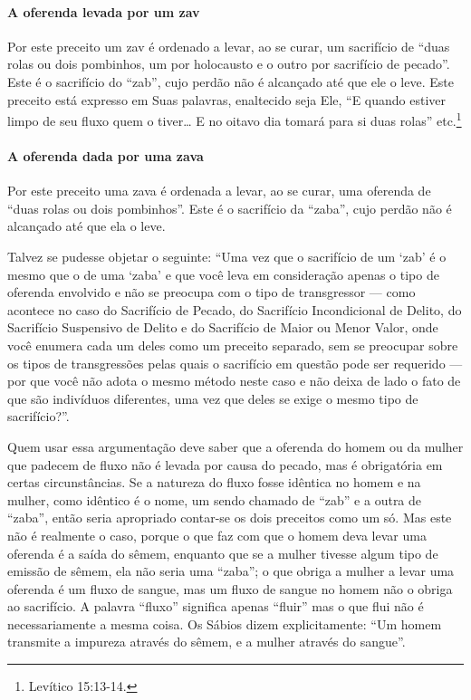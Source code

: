 \paragraph{A oferenda levada por um zav\starr}

Por este preceito um zav\starr{} é ordenado a levar, ao
se curar, um sacrifício de ``duas rolas ou dois pombinhos, um por holocausto e o
outro por sacrifício de pecado''. Este é o sacrifício do ``zab'', cujo perdão não
é alcançado até que ele o leve. Este preceito está expresso em Suas
palavras, enaltecido seja Ele, ``E quando estiver limpo de seu fluxo
quem o tiver\ldots{} E no oitavo dia tomará para si duas rolas'' etc.\footnote{Levítico 15:13-14.}

\paragraph{A oferenda dada por uma zava\starr}

Por este preceito uma zava\starr{} é ordenada a levar,
ao se curar, uma oferenda de ``duas rolas ou dois pombinhos''. Este é o
sacrifício da ``zaba'', cujo perdão não é alcançado até que ela o leve.

Talvez se pudesse objetar o seguinte: ``Uma vez que o sacrifício de um
`zab' é o mesmo que o de uma `zaba' e que você leva em consideração
apenas o tipo de oferenda envolvido e não se preocupa com o tipo de
transgressor --- como acontece no caso do Sacrifício de Pecado, do
Sacrifício Incondicional de Delito, do Sacrifício Suspensivo de Delito
e do Sacrifício de Maior ou Menor Valor, onde você enumera cada um deles
como um preceito separado, sem se preocupar sobre os tipos de
transgressões pelas quais o sacrifício em questão pode ser requerido ---
por que você não adota o mesmo método neste caso e não deixa de lado o
fato de que são indivíduos diferentes, uma vez que deles se exige o
mesmo tipo de sacrifício?''.

Quem usar essa argumentação deve saber que a oferenda do homem ou da
mulher que padecem de fluxo não é levada por causa do pecado, mas é
obrigatória em certas circunstâncias. Se a natureza do fluxo fosse
idêntica no homem e na mulher, como idêntico é o nome, um sendo chamado
de ``zab'' e a outra de ``zaba'', então seria apropriado contar-se os
dois preceitos como um só. Mas este não é realmente o caso, porque o que
faz com que o homem deva levar uma oferenda é a saída do sêmem, enquanto
que se a mulher tivesse algum tipo de emissão de sêmem, ela não seria
uma ``zaba''; o que obriga a mulher a levar uma oferenda é um fluxo de sangue, mas um fluxo de sangue
no homem não o obriga ao sacrifício. A palavra ``fluxo'' significa
apenas ``fluir'' mas o que flui não é necessariamente a mesma coisa. Os
Sábios dizem explicitamente: ``Um homem transmite a impureza através do
sêmem, e a mulher através do sangue''.

